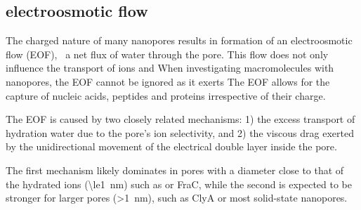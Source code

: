 \documentclass[journal=ancac3,manuscript=article,etalmode=truncate,maxauthors=0,layout=onecolumn]{achemso}
\begin{document}


%

\subsection{electroosmotic flow}\label{sec:eof}




The charged nature of many nanopores results in formation of an electroosmotic flow (EOF), \ie{}~a net flux of water through the pore. This flow does not only influence the transport of ions and When investigating macromolecules with nanopores, the EOF cannot be ignored as it exerts The EOF allows for the capture of nucleic acids\cite{Wong-2007}, peptides\cite{Huang-2017} and proteins \cite{Soskine-2012,Soskine-2013,VanMeervelt-2014,Soskine-Biesemans-2015,Biesemans-Soskine-2015,Wloka-2017} irrespective of their charge.

The EOF is caused by two closely related mechanisms: 1) the excess transport of
hydration water due to the pore's ion selectivity, and 2) the viscous drag
exerted by the unidirectional movement of the electrical double layer inside the
pore.


The first mechanism likely dominates in pores with a diameter close to that of
the hydrated ions (\SI{\le1}{\nm}) such as \ahl\cite{} or FraC,\cite{Huang-2017}
while the second is expected to be stronger for larger pores (\SI{>1}{\nm}),
such as ClyA\cite{Soskine-2012} or most solid-state nanopores.
\end{document}
